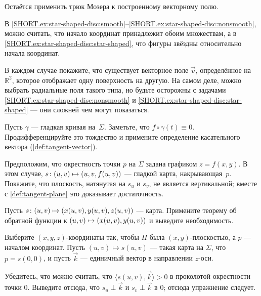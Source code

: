 \begin{multicols}{2}
Остаётся применить трюк Мозера к построенному векторному полю.

В \ref{SHORT.ex:star-shaped-disc:smooth}--\ref{SHORT.ex:star-shaped-disc:nonsmooth}, можно считать, что начало координат принадлежит обоим множествам, а в \ref{SHORT.ex:star-shaped-disc:star-shaped}, что фигуры звёздны относительно начала координат.

В каждом случае покажите, что существует векторное поле $\vec v$, определённое на $\mathbb{R}^2$, которое отображает одну поверхность на другую.
На самом деле, можно выбрать радиальные поля такого типа,
но будьте осторожны с задачами \ref{SHORT.ex:star-shaped-disc:nonsmooth} и \ref{SHORT.ex:star-shaped-disc:star-shaped} --- они сложней чем могут показаться.



\setcounter{eqtn}{0}

Пусть $\gamma$ --- гладкая кривая на~$\Sigma$.
Заметьте, что $f\circ\gamma(t)\equiv 0$.
Продифференцируйте это тождество и примените определение касательного вектора (\ref{def:tangent-vector}).

Предположим, что окрестность точки $p$ на $\Sigma$ задана графиком $z=f(x,y)$.
В этом случае, $s\:(u,v)\z\mapsto (u,v,f(u,v))$ --- гладкой карта, накрывающая~$p$.
Покажите, что плоскость, натянутая на $s_u$ и $s_v$, не является вертикальной;
вместе с \ref{def:tangent-plane} это доказывает достаточность.

Пусть
$s\:(u,v)\z\mapsto(x(u,v),y(u,v),z(u,v))$ --- карта.
Примените теорему об обратной функции к $(u,v)\z\mapsto(x(u,v),y(u,v))$ и выведите необходимость.

Выберите $(x,y,z)$-координаты так, чтобы $\Pi$ была $(x,y)$-плоскостью, а $p$ --- началом координат.
Пусть $(u,v)\mapsto s(u,v)$ --- такая карта на $\Sigma$, что $p=s(0,0)$,
и пусть $\vec k$ --- единичный вектор в направлении $z$-оси.

Убедитесь, что можно считать, что $\langle s(u,v),\vec k\rangle>0$ в проколотой окрестности точки $0$.
Выведите отсюда, что $s_u\perp \vec k$ и $s_v\perp \vec k$ в
$0$; отсюда упражнение следует.


\end{multicols}
